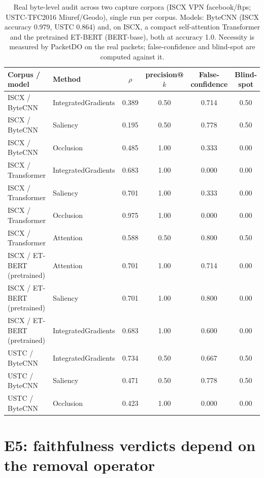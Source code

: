 \documentclass[journal]{IEEEtran}
\begin{document}
\begin{table}[!t]
\centering
\caption{Real byte-level audit across two capture corpora (ISCX VPN facebook/ftps; USTC-TFC2016 Miuref/Geodo), single run per corpus. Models: ByteCNN (ISCX accuracy 0.979, USTC 0.864) and, on ISCX, a compact self-attention Transformer and the pretrained ET-BERT (BERT-base), both at accuracy 1.0. Necessity is measured by PacketDO on the real packets; false-confidence and blind-spot are computed against it.}
\label{tab:realbyte}
\small
\begin{tabular}{@{}llcccc@{}}
\toprule
Corpus / model & Method & $\rho$ & precision@$k$ & False-confidence & Blind-spot \\
\midrule
ISCX / ByteCNN & IntegratedGradients & 0.389 & 0.50 & 0.714 & 0.50 \\
ISCX / ByteCNN & Saliency & 0.195 & 0.50 & 0.778 & 0.50 \\
ISCX / ByteCNN & Occlusion & 0.485 & 1.00 & 0.333 & 0.00 \\
\addlinespace
ISCX / Transformer & IntegratedGradients & 0.683 & 1.00 & 0.000 & 0.00 \\
ISCX / Transformer & Saliency & 0.701 & 1.00 & 0.333 & 0.00 \\
ISCX / Transformer & Occlusion & 0.975 & 1.00 & 0.000 & 0.00 \\
ISCX / Transformer & Attention & 0.588 & 0.50 & 0.800 & 0.50 \\
\addlinespace
ISCX / ET-BERT (pretrained) & Attention & 0.701 & 1.00 & 0.714 & 0.00 \\
ISCX / ET-BERT (pretrained) & Saliency & 0.701 & 1.00 & 0.800 & 0.00 \\
ISCX / ET-BERT (pretrained) & IntegratedGradients & 0.683 & 1.00 & 0.600 & 0.00 \\
\addlinespace
USTC / ByteCNN & IntegratedGradients & 0.734 & 0.50 & 0.667 & 0.50 \\
USTC / ByteCNN & Saliency & 0.471 & 0.50 & 0.778 & 0.50 \\
USTC / ByteCNN & Occlusion & 0.423 & 1.00 & 0.000 & 0.00 \\
\bottomrule
\end{tabular}
\end{table}

\section{E5: faithfulness verdicts depend on the removal operator}
\end{document}
